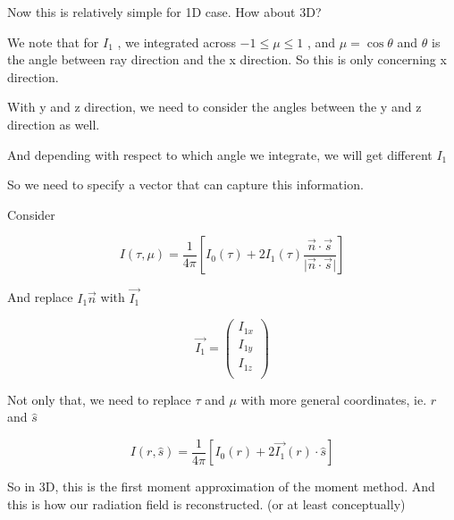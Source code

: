 \documentclass[12pt]{article}
\renewcommand{\_}{\kern-1.5pt\textunderscore\kern-1.5pt}
\begin{document}
\begin{itemize}
\vspace{\baselineskip}
Now this is relatively simple for 1D case. How about 3D?\par

We note that for  \( I_{1} \) , we integrated across  \( -1 \leq  \mu  \leq 1 \) , and  \(  \mu =\cos  \theta  \)  and  \(  \theta  \)  is the angle between ray direction and the x direction. So this is only concerning x direction.\par

With y and z direction, we need to consider the angles between the y and z direction as well.  \par

And depending with respect to which angle we integrate, we will get different  \( I_{1} \) \par

So we need to specify a vector that can capture this information.\par

Consider \par

 \[ I \left(  \tau, \mu  \right) =\frac{1}{4 \pi } \left[ I_{0} \left(  \tau \right) +2I_{1} \left(  \tau \right) \frac{\overrightarrow{n} \cdot \overrightarrow{s}}{ \vert \overrightarrow{n} \cdot \overrightarrow{s} \vert } \right]  \] \par

And replace  \( I_{1}\overrightarrow{n} \)  with  \( \overrightarrow{I_{1}} \) \par

 \[ \overrightarrow{I_{1}}= \left( \begin{array}{c}
	I_{1x}\\
	I_{1y}\\
	I_{1z}\\
	\end{array} \right)  \] \par

Not only that, we need to replace  \(  \tau \)  and  \(  \mu  \)  with more general coordinates, ie.  \( r \)  and  \( \hat{s} \) \par

 \[ I \left( r,\hat{s} \right) =\frac{1}{4 \pi } \left[ I_{0} \left( r \right) +2\overrightarrow{I_{1}} \left( r \right)  \cdot \hat{s} \right]  \] \par

So in 3D, this is the first moment approximation of the moment method. And this is how our radiation field is reconstructed. (or at least conceptually)\par


\end{itemize}
\end{document}
